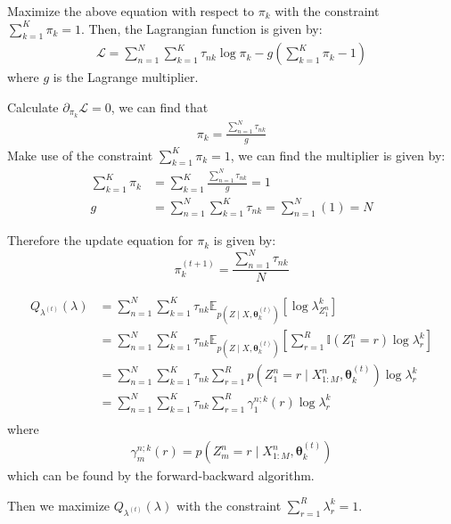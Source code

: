 \documentclass[12pt]{article}
\newenvironment{problem}[2][Problem]{\begin{trivlist}
\item[\hskip \labelsep {\bfseries #1}\hskip \labelsep {\bfseries #2.}]}{\end{trivlist}}
\begin{document}
\begin{problem}{2.7.21}
Maximize the above equation with respect to $\pi_k$ with the constraint $\sum_{k=1}^{K}\pi_k = 1$.
Then, the Lagrangian function is given by:
\begin{align*}
    \mathcal{L} = \sum_{n=1}^{N} \sum_{k=1}^{K} \tau_{nk} \log \pi_k - g(\sum_{k=1}^{K} \pi_k - 1)
\end{align*}
where $g$ is the Lagrange multiplier.

Calculate $\partial_{\pi_k}\mathcal{L} = 0$, we can find that
\begin{align*}
    \pi_k = \frac{\sum_{n=1}^{N} \tau_{nk}}{g}
\end{align*}
Make use of the constraint $\sum_{k=1}^{K}\pi_k = 1$, we can find the multiplier 
is given by:
\begin{align*} 
    \sum_{k=1}^{K}\pi_k &= \sum_{k=1}^{K} \frac{\sum_{n=1}^{N} \tau_{nk}}{g} = 1 \\
    g &= \sum_{n=1}^{N} \sum_{k=1}^{K}\tau_{nk} = \sum_{n=1}^{N} (1) = N
\end{align*}

Therefore the update equation for $\pi_k$ is given by:
\begin{equation}
    \pi_k^{(t+1)} = \frac{\sum_{n=1}^{N} \tau_{nk}}{N} \label{eq:Q27-update_pi_k}
\end{equation}

\begin{align*}
    Q_{\lambda^{(t)}}(\lambda) &= \sum_{n=1}^{N} \sum_{k=1}^{K}
        \tau_{nk} \mathbb{E}_{p(Z\mid X, \bm{\theta}^{(t)}_k)}[\log \lambda^k_{Z^n_1}] \\
    &= \sum_{n=1}^{N} \sum_{k=1}^{K} \tau_{nk} \mathbb{E}_{p(Z\mid X, \bm{\theta}^{(t)}_k)}
        [\sum_{r=1}^{R}\mathbb{I}(Z^n_1 = r)\log \lambda^k_{r}] \\
    &= \sum_{n=1}^{N} \sum_{k=1}^{K} \tau_{nk} \sum_{r=1}^{R} 
        p(Z^n_1 = r\mid X^n_{1:M}, \bm{\theta}^{(t)}_k) \log \lambda^k_{r} \\
    &= \sum_{n=1}^{N} \sum_{k=1}^{K} \tau_{nk} \sum_{r=1}^{R} 
        \gamma^{n;k}_{1}(r) \log \lambda^k_{r} \\
\end{align*}
where
\begin{align*}
    \gamma^{n;k}_{m}(r) = p(Z^n_m = r\mid X^n_{1:M}, \bm{\theta}^{(t)}_k)
\end{align*}
which can be found by the forward-backward algorithm.

Then we maximize $Q_{\lambda^{(t)}}(\lambda)$ with the constraint 
$\sum_{r=1}^{R} \lambda_r^k = 1$.


\end{problem}
\end{document}
